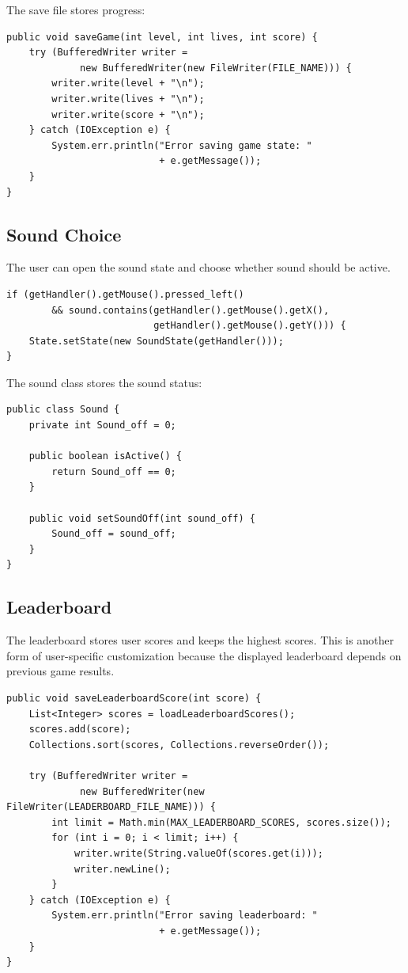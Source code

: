 \documentclass[12pt,a4paper]{article}
\begin{document}
The save file stores progress:

\begin{lstlisting}
public void saveGame(int level, int lives, int score) {
    try (BufferedWriter writer =
             new BufferedWriter(new FileWriter(FILE_NAME))) {
        writer.write(level + "\n");
        writer.write(lives + "\n");
        writer.write(score + "\n");
    } catch (IOException e) {
        System.err.println("Error saving game state: "
                           + e.getMessage());
    }
}
\end{lstlisting}

\subsection{Sound Choice}

The user can open the sound state and choose whether sound should be active.

\begin{lstlisting}
if (getHandler().getMouse().pressed_left()
        && sound.contains(getHandler().getMouse().getX(),
                          getHandler().getMouse().getY())) {
    State.setState(new SoundState(getHandler()));
}
\end{lstlisting}

The sound class stores the sound status:

\begin{lstlisting}
public class Sound {
    private int Sound_off = 0;

    public boolean isActive() {
        return Sound_off == 0;
    }

    public void setSoundOff(int sound_off) {
        Sound_off = sound_off;
    }
}
\end{lstlisting}

\subsection{Leaderboard}

The leaderboard stores user scores and keeps the highest scores. This is another form of user-specific customization because the displayed leaderboard depends on previous game results.

\begin{lstlisting}
public void saveLeaderboardScore(int score) {
    List<Integer> scores = loadLeaderboardScores();
    scores.add(score);
    Collections.sort(scores, Collections.reverseOrder());

    try (BufferedWriter writer =
             new BufferedWriter(new FileWriter(LEADERBOARD_FILE_NAME))) {
        int limit = Math.min(MAX_LEADERBOARD_SCORES, scores.size());
        for (int i = 0; i < limit; i++) {
            writer.write(String.valueOf(scores.get(i)));
            writer.newLine();
        }
    } catch (IOException e) {
        System.err.println("Error saving leaderboard: "
                           + e.getMessage());
    }
}
\end{lstlisting}
\end{document}
